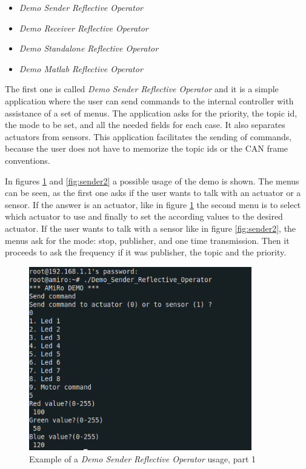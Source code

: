 \documentclass[12pt]{report}%
\begin{document}
\begin{itemize}
  \item \textit{Demo Sender Reflective Operator}
  \item \textit{Demo Receiver Reflective Operator}
	\item \textit{Demo Standalone Reflective Operator}
	\item \textit{Demo Matlab Reflective Operator}
\end{itemize}

The first one is called \textit{Demo Sender Reflective Operator} and it is a simple application where the user can send commands to the internal controller with assistance of a set of menus. The application asks for the priority, the topic id, the mode to be set, and all the needed fields for each case. It also separates actuators from sensors. This application facilitates the sending of commands, because the user does not have to memorize the topic ids or the CAN frame conventions.

In figures \ref{fig:sender1} and \ref{fig:sender2} a possible usage of the demo is shown. The menus can be seen, as the first one asks if the user wants to talk with an actuator or a sensor. If the answer is an actuator, like in figure \ref{fig:sender1} the second menu is to select which actuator to use and finally to set the according values to the desired actuator. If the user wants to talk with a sensor like in figure \ref{fig:sender2}, the menus ask for the mode: stop, publisher, and one time transmission. Then it proceeds to ask the frequency if it was publisher, the topic and the priority.

\begin{figure}[ht]
 \centering
 \includegraphics[width=\textwidth, height=8cm]{sender_example2}
		\caption{Example of a \textit{Demo Sender Reflective Operator} usage, part 1}
		\label{fig:sender1}
\end{figure}
\end{document}
